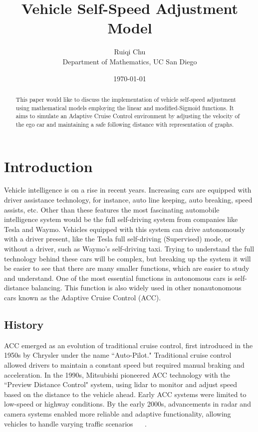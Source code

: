 \documentclass[12pt]{article}
\title{Vehicle Self-Speed Adjustment Model}
\author{Ruiqi Chu \\ 
Department of Mathematics, UC San Diego}
\date{\today}
\begin{document}
\maketitle

\begin{abstract}
This paper would like to discuss the implementation of vehicle self-speed adjustment using mathematical models employing the linear and modified-Sigmoid functions. It aims to simulate an Adaptive Cruise Control environment by adjusting the velocity of the ego car and maintaining a safe following distance with representation of graphs. 
\end{abstract}

\section*{Introduction}

Vehicle intelligence is on a rise in recent years. Increasing cars are equipped with driver assistance technology, for instance, auto line keeping, auto breaking, speed assists, etc. Other than these features the most fascinating automobile intelligence system would be the full self-driving system from companies like Tesla and Waymo. Vehicles equipped with this system can drive autonomously with a driver present, like the Tesla full self-driving (Supervised) mode, or without a driver, such as Waymo’s self-driving taxi. Trying to understand the full technology behind these cars will be complex, but breaking up the system it will be easier to see that there are many smaller functions, which are easier to study and understand. One of the most essential functions in autonomous cars is self-distance balancing. This function is also widely used in other nonautonomous cars known as the Adaptive Cruise Control (ACC). 

\subsection*{History }
ACC emerged as an evolution of traditional cruise control, first introduced in the 1950s by Chrysler under the name ``Auto-Pilot." Traditional cruise control allowed drivers to maintain a constant speed but required manual braking and acceleration. In the 1990s, Mitsubishi pioneered ACC technology with the ``Preview Distance Control" system, using lidar to monitor and adjust speed based on the distance to the vehicle ahead. Early ACC systems were limited to low-speed or highway conditions. By the early 2000s, advancements in radar and camera systems enabled more reliable and adaptive functionality, allowing vehicles to handle varying traffic scenarios ~\cite{adas_features} ~\cite{automated_driving_history}.
\end{document}
